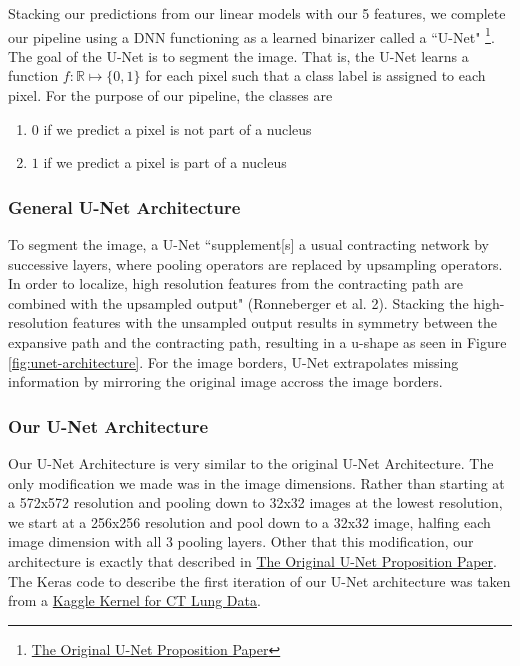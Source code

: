 \documentclass[paper=letter, fontsize=12pt]{article}
\numberwithin{equation}{section} %
\numberwithin{figure}{section} %
\numberwithin{table}{section} %
\begin{document}
Stacking our predictions from our linear models with our 5 features, we complete
our pipeline using a DNN functioning as a learned binarizer called a ``U-Net"
\footnote{\href{https://arxiv.org/pdf/1505.04597.pdf}{The Original U-Net Proposition Paper}}.
The goal of the U-Net is to segment the image. That is, the U-Net learns a function
$f : \mathbb{R} \mapsto \{0, 1\}$ for each pixel such that a class label is assigned
to each pixel. For the purpose of our pipeline, the classes are
\begin{enumerate}
  \item $0$ if we predict a pixel is not part of a nucleus
  \item $1$ if we predict a pixel is part of a nucleus
\end{enumerate}

\subsubsection{General U-Net Architecture}
To segment the image, a U-Net ``supplement[s] a usual contracting network by
successive layers, where pooling operators are replaced by upsampling
operators. In order to localize, high resolution features from the contracting
path are combined with the upsampled output" (Ronneberger et al. 2). Stacking
the high-resolution features with the unsampled output results in symmetry
between the expansive path and the contracting path, resulting in a u-shape as
seen in Figure \ref{fig:unet-architecture}. For the image borders, U-Net
extrapolates missing information by mirroring the original image accross the
image borders.

\subsubsection{Our U-Net Architecture}
Our U-Net Architecture is very similar to the original U-Net Architecture. The
only modification we made was in the image dimensions. Rather than starting at
a 572x572 resolution and pooling down to 32x32 images at the lowest
resolution, we start at a 256x256 resolution and pool down to a 32x32 image,
halfing each image dimension with all 3 pooling layers. Other that this
modification, our architecture is exactly that described in
\href{https://arxiv.org/pdf/1505.04597.pdf}{The Original U-Net Proposition
Paper}.  The Keras code to describe the first iteration of our U-Net
architecture was taken from a
\href{https://www.kaggle.com/toregil/a-lung-u-net-in-keras}{Kaggle Kernel for
CT Lung Data}.
\end{document}
